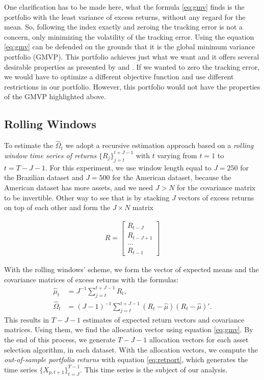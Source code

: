 \documentclass[preprint, doubleblind, authoryear,10pt]{elsarticle}
\begin{document}
One clarification has to be made here, what the formula \eqref{eq:gmv} finds is the portfolio with the least variance of excess returns, without any regard for the mean.
So, following the index exactly and zeroing the tracking error is not a concern, only minimizing the volatility of the tracking error.
Using the equation \eqref{eq:gmv} can be defended on the grounds that it is the global minimum variance portfolio (GMVP).
This portfolio achieves just what we want and it offers several desirable properties as presented by \cite{jag-2003} and \cite{CTS2006}.
If we wanted to zero the tracking error, we would have to optimize a different objective function and use different restrictions in our portfolio.
However, this portfolio would not have the properties of the GMVP highlighted above.

\subsection*{Rolling Windows}

To estimate the $\hat{\Omega}_{t}$ we adopt a recursive estimation approach based on a \textit{rolling window time series of returns} $\{R_{j}\}_{j=t}^{t+J-1}$ with $t$ varying from $t=1$ to $t=T-J-1$.
For this experiment, we use window length equal to $J=250$ for the Brazilian dataset and $J=500$ for the American dataset, because the American dataset has more assets, and we need $J>N$ for the covariance matrix to be invertible.
Other way to see that is by stacking $J$ vectors of excess returns on top of each other and form the $J \times N$ matrix 

\begin{align*}
R =
\begin{bmatrix}
	R_{t-J}	\\ R_{t-J+1} \\ \dots \\ R_{t-1}
\end{bmatrix}
\end{align*}

With the rolling windows' scheme, we form the vector of expected means and the covariance matrices of excess returns with the formulas:
\begin{align}
	\hat{\mu}_{t} &= J^{-1}\sum_{j=t}^{t+J-1} R_{t},
	\\
	\hat{\Omega}_{t} &= (J-1)^{-1} \sum_{j=t}^{t+J-1}(R_{t} - \hat{\mu})(R_{t} - \hat{\mu})'.
\end{align}
This results in $T-J-1$ estimates of expected return vectors and covariance matrices.
Using them, we find the allocation vector using equation \eqref{eq:gmv}.
By the end of this process, we generate $T-J-1$ allocation vectors for each asset selection algorithm, in each dataset.
With the allocation vectors, we compute the \textit{out-of-sample portfolio returns} with equation \eqref{eq:retport}, which generates the time series $\{X_{p,t+1}\}_{t=J}^{T-1}$.
This time series is the subject of our analysis. 
\end{document}
